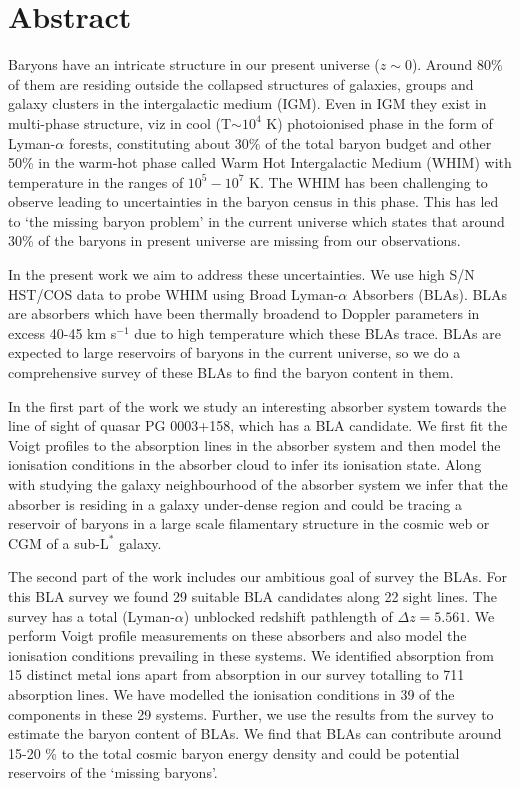 \chapter*{Abstract}

Baryons have an intricate structure in our present universe ($z\sim 0$). Around 80\% of them are residing outside the collapsed structures of galaxies, groups and galaxy clusters in the intergalactic medium (IGM). Even in IGM they exist in multi-phase structure, viz in cool (T$\sim10^4$ K) photoionised phase in the form of Lyman-$\alpha$ forests, constituting about 30\% of the total baryon budget and other 50\% in the warm-hot phase called Warm Hot Intergalactic Medium (WHIM) with temperature in the ranges of $10^5-10^7$ K. The WHIM has been challenging to observe leading to uncertainties in the baryon census in this phase. This has led to `the missing baryon problem' in the current universe which states that around 30\% of the baryons in present universe are missing from our observations.

In the present work we aim to address these uncertainties. We use high S/N HST/COS data to probe WHIM using Broad Lyman-$\alpha$ Absorbers (BLAs). BLAs are absorbers which have been thermally broadend to Doppler parameters in excess 40-45 km s$^{-1}$ due to high temperature which these BLAs trace. BLAs are expected to large reservoirs of baryons in the current universe, so we do a comprehensive survey of these BLAs to find the baryon content in them. 

In the first part of the work we study an interesting absorber system towards the line of sight of quasar PG 0003+158, which has a BLA candidate. We first fit the Voigt profiles to the absorption lines in the absorber system and then model the ionisation conditions in the absorber cloud to infer its ionisation state. Along with studying the galaxy neighbourhood of the absorber system we infer that the absorber is residing in a galaxy under-dense region and could be tracing a reservoir of baryons in a large scale filamentary structure in the cosmic web or CGM of a sub-$\text{L}^{*}$ galaxy.

The second part of the work includes our ambitious goal of survey the BLAs. For this BLA survey we found 29 suitable BLA candidates along 22 sight lines. The survey has a total  (Lyman-$\alpha$) unblocked redshift pathlength of $\Delta z = 5.561$. We perform Voigt profile measurements on these absorbers and also model the ionisation conditions prevailing in these systems. We identified absorption from 15 distinct metal ions apart from  absorption in our survey totalling to 711 absorption lines. We have modelled the ionisation conditions in 39 of the components in these 29 systems. Further, we use the results from the survey to estimate the baryon content of BLAs. We find that BLAs can contribute around 15-20 \% to the total cosmic baryon energy density and could be potential reservoirs of the  `missing baryons'.

